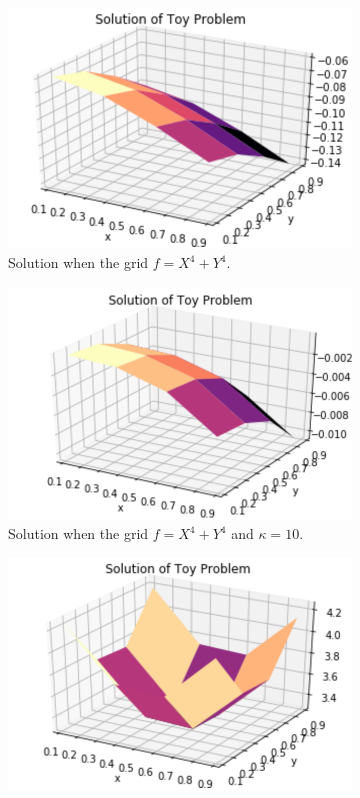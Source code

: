 \begin{figure}[H]
	\centering
	\begin{subfigure}[b]{0.45\linewidth}
		\centering
		\includegraphics[width=\linewidth]{Materials/f4}
		\caption{Solution when the grid $f = X^4+Y^4$.}
		\label{e1}
	\end{subfigure}
	\hfill
	\begin{subfigure}[b]{0.45\linewidth}
		\centering
		\includegraphics[width=\linewidth]{Materials/f4k10}
		\caption{Solution when the grid $f = X^4+Y^4$ and $\kappa = 10$.} 
		\label{e2}
	\end{subfigure}
	\begin{subfigure}[b]{0.45\linewidth}
		\centering
		\includegraphics[width=\linewidth]{Materials/b=1}

\end{subfigure}
\end{figure}
